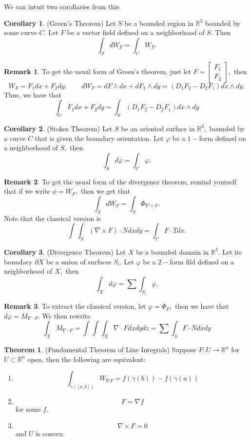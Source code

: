 \documentclass[10pt, oneside]{article}
\newcommand{\bbR}{\mathbb{R}}
\theoremstyle{definition}
\newtheorem{thm}{Theorem}
\newtheorem{rem}{Remark}
\newtheorem{cor}{Corollary}
\begin{document}
We can intuit two corollaries from this 
\begin{cor}
    (Green's Theorem) Let $S$ be a bounded region in $\bbR^2$ bounded by some curve $C.$ Let $F$ be a vector field defined on a neighborhood of $S.$ Then 
    \[\int_S dW_F = \int_C W_F.\]
\end{cor}
\begin{rem}
    To get the usual form of Green's theorem, just let $F = \begin{bmatrix}
        F_1\\ F_2
    \end{bmatrix},$ then 
    \[W_F = F_1 dx + F_2dy, \qquad dW_F = dF \wedge dx + dF_2\wedge dy = (D_1F_2 - D_2F_1)dx \wedge dy.\] Thus, we have that 
    \[\int_C F_1dx + F_2dy = \int_S (D_1F_2 - D_2F_1)dx\wedge dy\]
\end{rem}
\begin{cor}
    (Stokes Theorem) Let $S$ be an oriented surface in $\bbR^3,$ bounded by a curve $C$ that is given the boundary orientation. Let $\varphi$ be a $1-$form defined on a neighborhood of $S,$ then 
    \[\int_S d\varphi = \int_C \varphi.\]
\end{cor}
\begin{rem}
    To get the usual form of the divergence theorem, remind yourself that if we write $\phi = W_F,$ then we get that 
    \[\int_S dW_F = \int_S \Phi_{\nabla \times F}.\] Note that the classical version is 
    \[\int \int_S (\nabla \times F)\cdot N dxdy = \int_C F\cdot T dx.\] 
\end{rem}
\begin{cor}
    (Divergence Theorem)
    Let $X$ be a bounded domain in $\bbR^3.$ Let its boundary $\partial X$ be a union of surfaces $S_i.$ Let $\varphi$ be a $2-$form fild defined on a neighborhood of $X,$ then 
    \[\int_X d\varphi = \sum\int_{S_i} \varphi.\]
\end{cor}
\begin{rem}
    To extract the classical version, let $\varphi = \Phi_F,$ then we have that $d\varphi = M_{\nabla \cdot F}.$ We then rewrite 
    \[\int_X M_{\nabla \cdot F} = \int \int \int_X \nabla \cdot F dxdydz = \sum \int_S F\cdot N dxdy\]
\end{rem}

\begin{thm}
    (Fundamental Theorem of Line Integrals) Suppose $F: U \to \bbR^n$ for $U \subset \bbR^n$ open, then the following are equivalent:
    \begin{enumerate}
        \item \[\int_{\gamma([a,b])}W_{\nabla F} = f(\gamma(b)) - f(\gamma(a))\]
        \item \[F = \nabla f\] for some $f.$
        \item \[\nabla \times F = 0\] and $U$ is convex.
        
    \end{enumerate}
\end{thm}
\end{document}
